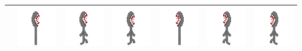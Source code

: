 \documentclass[../Main.tex]{subfiles}
\begin{document}
\begin{center}
\begin{tabular}{ | m{} | m{} m{} m{} m{} m{} m{} | }
                    & \centerline{\includegraphics[scale=3]{../res/textures/entities/enemies/dark/East.png}} & \centerline{\includegraphics[scale=3]{../res/textures/entities/enemies/dark/East-Walk-1.png}} & \centerline{\includegraphics[scale=3]{../res/textures/entities/enemies/dark/East-Walk-2.png}} & \centerline{\includegraphics[scale=3]{../res/textures/entities/enemies/dark/West.png}} & \centerline{\includegraphics[scale=3]{../res/textures/entities/enemies/dark/West-Walk-1.png}} & \centerline{\includegraphics[scale=3]{../res/textures/entities/enemies/dark/West-Walk-2.png}} \\
                    \hline
                \end{tabular}
            \end{center}
\end{document}
